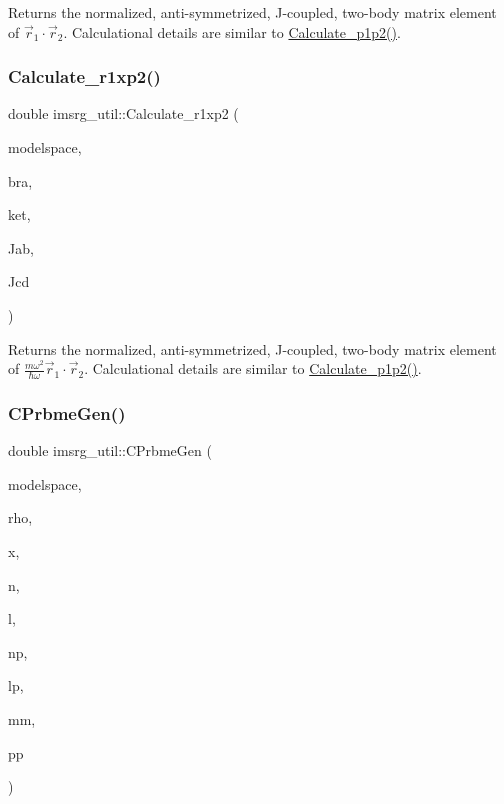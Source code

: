 Returns the normalized, anti-\/symmetrized, J-\/coupled, two-\/body matrix element of $ \vec{r}_1\cdot\vec{r}_2 $. Calculational details are similar to \hyperlink{namespaceimsrg__util_a3aad21447b8e28d22597a79220ba805a}{Calculate\+\_\+p1p2()}. \mbox{\label{namespaceimsrg__util_aa28f0db9ecf5d7a27908cda9fa579a31}} 
\subsubsection{\texorpdfstring{Calculate\+\_\+r1xp2()}{Calculate\_r1xp2()}}
{\footnotesize\ttfamily double imsrg\+\_\+util\+::\+Calculate\+\_\+r1xp2 (\begin{DoxyParamCaption}\item[{\hyperlink{classModelSpace}{Model\+Space} \&}]{modelspace,  }\item[{\hyperlink{classKet}{Ket} \&}]{bra,  }\item[{\hyperlink{classKet}{Ket} \&}]{ket,  }\item[{int}]{Jab,  }\item[{int}]{Jcd }\end{DoxyParamCaption})}

Returns the normalized, anti-\/symmetrized, J-\/coupled, two-\/body matrix element of $ \frac{m\omega^2}{\hbar \omega} \vec{r}_1\cdot\vec{r}_2 $. Calculational details are similar to \hyperlink{namespaceimsrg__util_a3aad21447b8e28d22597a79220ba805a}{Calculate\+\_\+p1p2()}. \mbox{\label{namespaceimsrg__util_a9e2f7d969020b57db388ecb464314ebb}} 
\subsubsection{\texorpdfstring{C\+Prbme\+Gen()}{CPrbmeGen()}}
{\footnotesize\ttfamily double imsrg\+\_\+util\+::\+C\+Prbme\+Gen (\begin{DoxyParamCaption}\item[{\hyperlink{classModelSpace}{Model\+Space} \&}]{modelspace,  }\item[{double}]{rho,  }\item[{double}]{x,  }\item[{int}]{n,  }\item[{int}]{l,  }\item[{int}]{np,  }\item[{int}]{lp,  }\item[{int}]{mm,  }\item[{double}]{pp }\end{DoxyParamCaption})}

